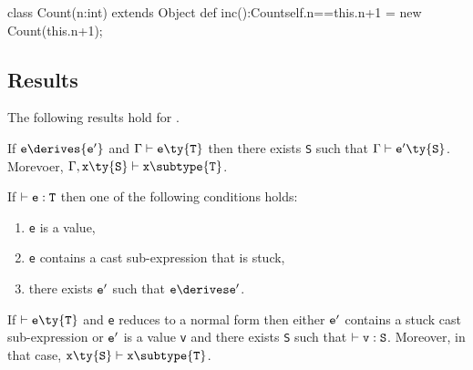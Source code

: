 \begin{xten}
class Count(n:int) extends Object {
  def inc():Count{self.n==this.n+1} =
  	new Count(this.n+1);
}
\end{xten}



\subsection{Results}
The following results hold for \FXGL{\cdot}.

\begin{theorem} If ${\tt e} \derives {\tt e'}$ and $\Gamma \vdash {\tt e}\ty{\tt T}$ then there exists {\tt S} such that $\Gamma\vdash{\tt e'}\ty{\tt S}$. Morevoer, $\Gamma,{\tt x}\ty{\tt S} \vdash {\tt x}\subtype{\tt T}$.
\end{theorem}

\begin{theorem}[Progress]
If $\vdash {\tt e:T}$ then one of the following conditions holds:
\begin{enumerate}
\item {\tt e} is a value,
\item {\tt e} contains a cast sub-expression that is stuck,
\item there exists $\tt e'$ such that $\tt e\derives e'$.
\end{enumerate}
\end{theorem}

\begin{theorem}
If $\vdash {\tt e}\ty{\tt T}$ and {\tt e}
reduces to a normal form then either ${\tt e'}$ contains a stuck cast sub-expression or ${\tt e'}$ is a value {\tt v} and there exists {\tt S} such that $\vdash {\tt v:S}$. Moreover, in that case, ${\tt x}\ty{\tt S}\vdash{\tt x}\subtype{\tt T}$.
\end{theorem}












